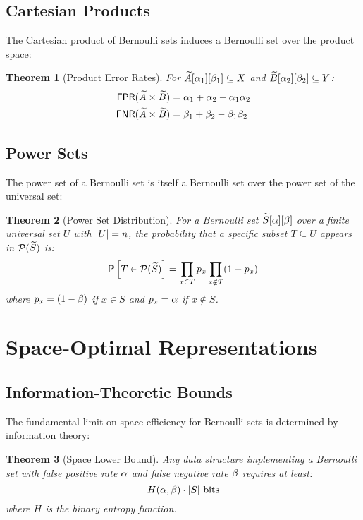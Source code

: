 \documentclass[11pt,final,hidelinks]{article}
\newtheorem{theorem}{Theorem}[section]
\begin{document}
\subsection{Cartesian Products}

The Cartesian product of Bernoulli sets induces a Bernoulli set over the product space:

\begin{theorem}[Product Error Rates]
For $\widetilde{A}[\alpha_1][\beta_1] \subseteq X$ and $\widetilde{B}[\alpha_2][\beta_2] \subseteq Y$:
\begin{align}
\mathsf{FPR}(\widetilde{A} \times \widetilde{B}) &= \alpha_1 + \alpha_2 - \alpha_1\alpha_2 \\
\mathsf{FNR}(\widetilde{A} \times \widetilde{B}) &= \beta_1 + \beta_2 - \beta_1\beta_2
\end{align}
\end{theorem}

\subsection{Power Sets}

The power set of a Bernoulli set is itself a Bernoulli set over the power set of the universal set:

\begin{theorem}[Power Set Distribution]
For a Bernoulli set $\widetilde{S}[\alpha][\beta]$ over a finite universal set $U$ with $\lvert U\rvert = n$, the probability that a specific subset $T \subseteq U$ appears in $\mathcal{P}(\widetilde{S})$ is:
\begin{equation}
\mathbb{P}\left[T \in \mathcal{P}(\widetilde{S})\right] = \prod_{x \in T} p_x \prod_{x \notin T} (1-p_x)
\end{equation}
where $p_x = (1-\beta)$ if $x \in S$ and $p_x = \alpha$ if $x \notin S$.
\end{theorem}

\section{Space-Optimal Representations}

\subsection{Information-Theoretic Bounds}

The fundamental limit on space efficiency for Bernoulli sets is determined by information theory:

\begin{theorem}[Space Lower Bound]
Any data structure implementing a Bernoulli set with false positive rate $\alpha$ and false negative rate $\beta$ requires at least:
\begin{equation}
H(\alpha, \beta) \cdot \lvert S\rvert \text{ bits}
\end{equation}
where $H$ is the binary entropy function.
\end{theorem}
\end{document}
